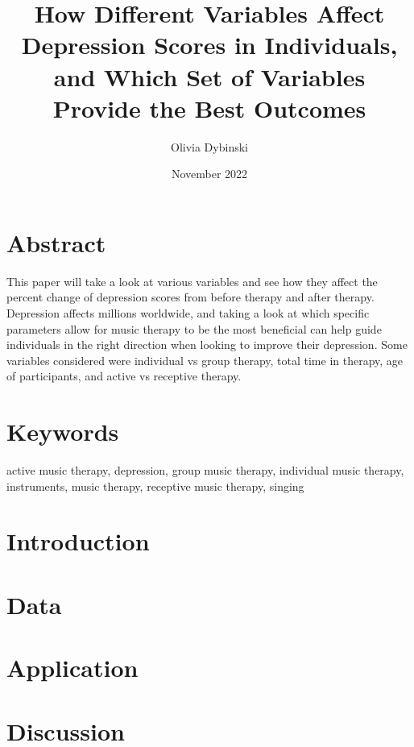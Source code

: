 \documentclass[12pt]{article}
\title{How Different Variables Affect Depression Scores in Individuals, and Which Set of Variables Provide the Best Outcomes}
\author{Olivia Dybinski\\}
\date{November 2022}
\begin{document}
 \maketitle


 \section{Abstract} 
 \label{sec:abstract}

 This paper will take a look at various variables and see how they affect the percent change of depression scores from before therapy and after therapy. Depression affects millions worldwide, and taking a look at which specific parameters allow for music therapy to be the most beneficial can help guide individuals in the right direction when looking to improve their depression. Some variables considered were individual vs group therapy, total time in therapy, age of participants, and active vs receptive therapy.

 \section{Keywords}
 \label{sec:key}

 active music therapy, depression, group music therapy, individual music therapy, instruments, music therapy, receptive music therapy, singing

 \section{Introduction} 
 \label{sec:intro}


 \section{Data} 
 \label{sec:data}


 \section{Application} 
 \label{sec:app}


 \section{Discussion} 
 \label{sec:disc}




 
 {}
\end{document}

